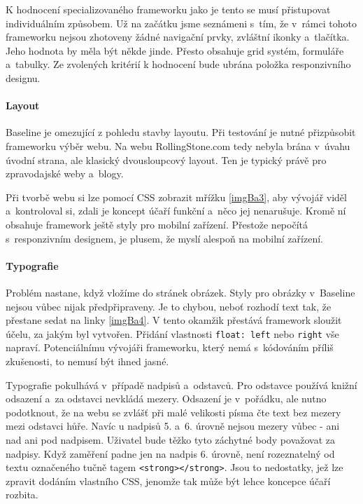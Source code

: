 \documentclass[thesis=B,czech]{FITthesis}[2012/06/26]
\begin{document}
K hodnocení specializovaného frameworku jako je tento se musí přistupovat individuálním způsobem. Už na začátku jsme seznámeni s~tím, že v~rámci tohoto frameworku nejsou zhotoveny žádné navigační prvky, zvláštní ikonky a~tlačítka. Jeho hodnota by měla být někde jinde. Přesto obsahuje grid  systém, formuláře a~tabulky. Ze zvolených kritérií k hodnocení bude ubrána položka responzivního designu.

\paragraph{Layout}

Baseline je omezující z pohledu stavby layoutu. Při testování je nutné přizpůsobit frameworku výběr webu. Na webu RollingStone.com tedy nebyla brána v~úvahu úvodní strana, ale klasický dvousloupcový layout. Ten je typický právě pro zpravodajské weby a~blogy.

Při tvorbě webu si lze pomocí \gls{CSS} zobrazit mřížku \ref{imgBa3}, aby vývojář viděl a~kontroloval si, zdali je koncept účaří funkční a~něco jej nenarušuje. Kromě ní obsahuje framework ještě styly pro mobilní zařízení. Přestože nepočítá s~responzivním designem, je plusem, že myslí alespoň na mobilní zařízení. 



\paragraph{Typografie}

Problém nastane, když vložíme do stránek obrázek. Styly pro obrázky v~Baseline nejsou vůbec nijak předpřipraveny. Je to chybou, neboť rozhodí text tak, že přestane sedat na linky \ref{imgBa4}. V tento okamžik přestává framework sloužit účelu, za jakým byl vytvořen. Přidání vlastnosti \verb#float: left# nebo \verb#right# vše napraví. Potenciálnímu vývojáři frameworku, který nemá s~kódováním příliš zkušenosti, to nemusí být ihned jasné. 


Typografie pokulhává v~případě nadpisů a~odstavců. Pro odstavce používá knižní odsazení a~za odstavci nevkládá mezery. Odsazení je v~pořádku, ale nutno podotknout, že na webu se zvlášť při malé velikosti písma čte text bez mezery mezi odstavci hůře. Navíc u nadpisů 5. a~6. úrovně nejsou mezery vůbec - ani nad ani pod nadpisem. Uživatel bude těžko tyto záchytné body považovat za nadpisy. Když zaměření padne jen na nadpis 6. úrovně, není rozeznatelný od textu označeného tučně tagem \verb#<strong></strong>#. Jsou to nedostatky, jež lze zpravit dodáním vlastního \gls{CSS}, jenomže tak může být lehce koncepce účaří rozbita.
\end{document}
